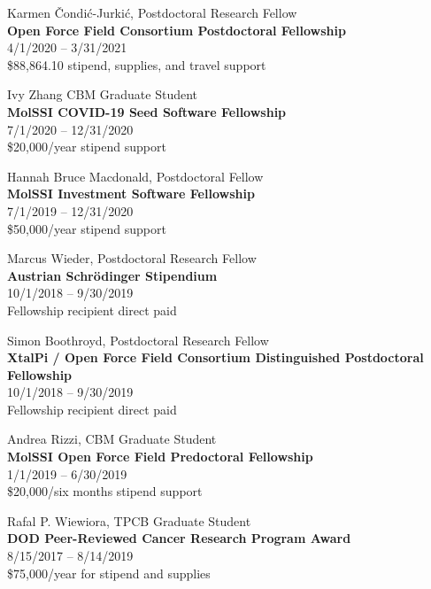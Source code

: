 \documentclass[10pt]{article}
\begin{document}
Karmen \v{C}ondi\'{c}-Jurki\'{c}, Postdoctoral Research Fellow\\
{\bf Open Force Field Consortium Postdoctoral Fellowship}\\
4/1/2020 -- 3/31/2021\\
\$88,864.10 stipend, supplies, and travel support

\vspace{1.5ex}

Ivy Zhang CBM Graduate Student\\
{\bf MolSSI COVID-19 Seed Software Fellowship}\\
7/1/2020 -- 12/31/2020\\
\$20,000/year stipend support

\vspace{1.5ex}

Hannah Bruce Macdonald, Postdoctoral Fellow\\
{\bf MolSSI Investment Software Fellowship}\\
7/1/2019 -- 12/31/2020\\
\$50,000/year stipend support

\vspace{1.5ex}

Marcus Wieder, Postdoctoral Research Fellow\\
{\bf Austrian Schr\"{o}dinger Stipendium}\\
10/1/2018 -- 9/30/2019\\
Fellowship recipient direct paid

\vspace{1.5ex}

Simon Boothroyd, Postdoctoral Research Fellow\\
{\bf XtalPi / Open Force Field Consortium Distinguished Postdoctoral Fellowship}\\
10/1/2018 -- 9/30/2019\\
Fellowship recipient direct paid

\vspace{1.5ex}

Andrea Rizzi, CBM Graduate Student\\
{\bf MolSSI Open Force Field Predoctoral Fellowship}\\
1/1/2019 -- 6/30/2019\\
\$20,000/six months stipend support

\vspace{1.5ex}

Rafal P. Wiewiora, TPCB Graduate Student\\
{\bf DOD Peer-Reviewed Cancer Research Program Award}\\
8/15/2017 -- 8/14/2019\\
 \$75,000/year for stipend and supplies
\end{document}
